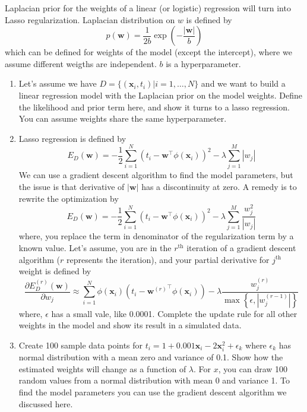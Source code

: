 \documentclass{article}
\begin{document}
Laplacian prior for the weights of a linear (or logistic) regression will turn into 
Lasso regularization. Laplacian distribution on $w$ is defined by 
\begin{equation}
    p(\mathbf{w}) = \frac{1}{2b} \exp\left(-\frac{|\mathbf{w}|}{b}\right)
\end{equation}
which can be defined for weights of the model (except the intercept), where we assume different weigths 
are independent. $b$ is a hyperparameter. 
\begin{enumerate}
    \item Let’s assume we have $D = \{(\mathbf{x}_i,t_i)| i = 1, \dots, N\}$  and  we  want  to  build  a  linear  regression  model 
    with the Laplacian prior on the model weights. Define the likelihood and prior term here, and show it turns 
    to a lasso regression. You can assume weights share the same hyperparameter. 
    \item Lasso regression is defined by
    \begin{equation}
        E_D(\mathbf{w}) = -\frac{1}{2}\sum_{i=1}^N (t_i - \mathbf{w}^\top\phi(\mathbf{x}_i))^2 - \lambda\sum_{j=1}^M |w_j|
    \end{equation}
    We can use a gradient descent algorithm to find the model parameters, but the issue is that derivative of $|\mathbf{w}|$ has a discontinuity at zero. A remedy is to rewrite the optimization by
    \begin{equation}
        E_D(\mathbf{w}) = -\frac{1}{2}\sum_{i=1}^N (t_i - \mathbf{w}^\top\phi(\mathbf{x}_i))^2 - \lambda\sum_{j=1}^M \frac{w_j^2}{|w_j|}
    \end{equation}
    where, you replace the term in denominator of the regularization term by a known value. Let’s assume, you are in the $r^{\text{th}}$ iteration of a gradient descent algorithm ($r$ represents the iteration), and your partial 
    derivative for $j^{\text{th}}$ weight is defined by 
    \begin{equation}
        \dfrac{\partial E_D^{(r)}(\mathbf{w})}{\partial w_j} \approx \sum_{i=1}^{N} \phi(\mathbf{x}_i)\left(t_i - {\mathbf{w}^{(r)}}^\top \phi(\mathbf{x}_i)\right) - \lambda \frac{w_j^{(r)}}{\max \left\{\epsilon, |w_j^{(r-1)}|\right\}}
    \end{equation}
    where, $\epsilon$ has a small vale, like 0.0001. Complete the update rule for all other weights in the model and show its result in a simulated data.  
    
    \item Create 100 sample data points for $t_i = 1 + 0.001 \mathbf{x}_i - 2 \mathbf{x}_i^2 +\epsilon_k$ where $\epsilon_k$ has normal distribution 
    with a mean zero and variance of 0.1. Show how the estimated weights will change as a function of $\lambda$. For 
    $x$, you can draw  100 random values from a normal distribution with mean 0 and variance 1. To find the 
    model parameters you can use the gradient descent algorithm we discussed here. 
\end{enumerate}
\end{document}
